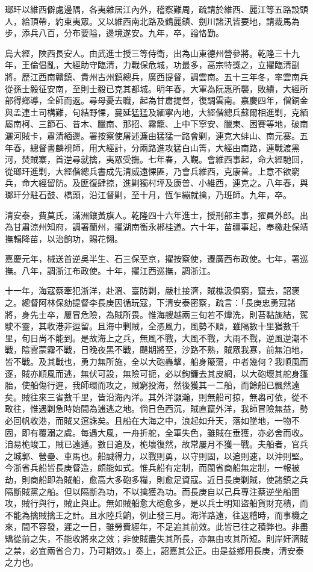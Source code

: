 \begin{pinyinscope}
瑯玕以維西僻處邊隅，各夷雜居江內外，稽察難周，疏請於維西、麗江等五路設頭人，給頂帶，約束夷眾。又以維西南北路及鶴麗鎮、劍川諸汛皆要地，請裁馬為步，添兵八百，分布要隘，邊境遂安。九年，卒，謚恪勤。

烏大經，陜西長安人。由武進士授三等侍衛，出為山東德州營參將。乾隆三十九年，王倫倡亂，大經助守臨清，力戰保危城，功最多，高宗特獎之，立擢臨清副將。歷江西南贛鎮、貴州古州鎮總兵，廣西提督，調雲南。五十三年冬，率雲南兵從孫士毅征安南，至則士毅已克其都城。明年春，大軍為阮惠所襲，敗績，大經所部得鄉導，全師而返。尋母憂去職，起為甘肅提督，復調雲南。嘉慶四年，僧銅金與孟連土司構難，句結野惈，蔓延猛猛及緬寧內地，大經偕總兵蘇爾相進剿，克緬屬南柯、三節石、昔木、臘南、那招、霧籠、上中下寧安、臘東、困賽等地，破南灑河賊卡，肅清緬邊。署按察使屠述濂由猛猛一路會剿，連克大蚌山、南元寨。五年春，總督書麟視師，用大經計，分兩路進攻猛白山箐，大經由南路，連戰渡黑河，焚賊寨，首逆尋就擒，夷眾受撫。七年春，入覲。會維西事起，命大經馳回，從瑯玕進剿，大經偕總兵書成先清威遠惈匪，乃會兵維西，克康普。上意不欲窮兵，命大經留防。及匪復肆掠，進剿獨村坪及康普、小維西，連克之。八年春，與瑯玕分駐石鼓、橋頭，沿江督剿，至十月，恆乍繃就擒，乃班師。九年，卒。

清安泰，費莫氏，滿洲鑲黃旗人。乾隆四十六年進士，授刑部主事，擢員外郎。出為甘肅涼州知府，調署蘭州，擢湖南衡永郴桂道。六十年，苗疆事起，奉檄赴保靖撫輯降苗，以治餉功，賜花翎。

嘉慶元年，械送首逆吳半生、石三保至京，擢按察使，遷廣西布政使。七年，署巡撫。八年，調浙江布政使。十年，擢江西巡撫，調浙江。

十一年，海寇蔡牽犯浙洋，赴溫、臺防剿，嚴杜接濟，賊樵汲俱窮，竄去，詔褒之。總督阿林保劾提督李長庚因循玩寇，下清安泰密察，疏言：「長庚忠勇冠諸將，身先士卒，屢冒危險，為賊所畏。惟海艘越兩三旬若不燂洗，則苔黏旐結，駕駛不靈，其收港非逗留。且海中剿賊，全憑風力，風勢不順，雖隔數十里猶數千里，旬日尚不能到。是故海上之兵，無風不戰，大風不戰，大雨不戰，逆風逆潮不戰，陰雲蒙霧不戰，日晚夜黑不戰，颶期將至，沙路不熟，賊眾我寡，前無泊地，皆不戰。及其戰也，勇力無所施，全以大砲轟擊，船身簸蕩，中者幾何？我順風而逐，賊亦順風而逃，無伏可設，無險可扼，必以鉤鐮去其皮網，以大砲壞其舵身篷胎，使船傷行遲，我師環而攻之，賊窮投海，然後獲其一二船，而餘船已飄然遠矣。賊往來三省數千里，皆沿海內洋。其外洋灝瀚，則無船可掠，無嶴可依，從不敢往，惟遇剿急時始間為逋逃之地。倘日色西沉，賊直竄外洋，我師冒險無益，勢必回帆收港，而賊又逭誅矣。且船在大海之中，浪起如升天，落如墜地，一物不固，即有覆溺之虞。每遇大風，一舟折舵，全軍失色，雖賊在垂獲，亦必舍而收。洎易桅竣工，賊已遠遁。數日追及，桅壞復然，故常屢月不獲一戰。夫船者，官兵之城郭、營壘、車馬也。船誠得力，以戰則勇，以守則固，以追則速，以沖則堅。今浙省兵船皆長庚督造，頗能如式。惟兵船有定制，而閩省商船無定制，一報被劫，則商船即為賊船，愈高大多砲多糧，則愈足資寇。近日長庚剿賊，使諸鎮之兵隔斷賊黨之船。但以隔斷為功，不以擒獲為功。而長庚自以己兵專注蔡逆坐船圍攻，賊行與行，賊止與止。無如賊船愈大砲愈多，是以兵士明知盜船貨財充積，而不能為擒賊擒王之計。且水陸兵餉，例止發三月。海洋路遠，往返稽時，而事機之來，間不容發，遲之一日，雖勞費經年，不足追其前效。此皆已往之積弊也。非盡矯從前之失，不能收將來之效；非使賊盡失其所長，亦無由攻其所短。則岸奸濟賊之禁，必宜兩省合力，乃可期效。」奏上，詔嘉其公正。由是益鄉用長庚，清安泰之力也。


\end{pinyinscope}
